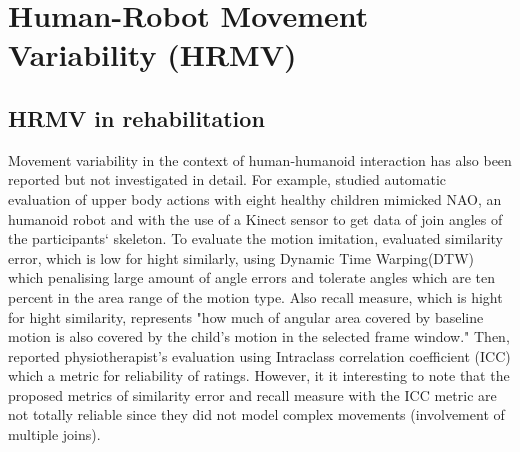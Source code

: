 \section{Human-Robot Movement Variability (HRMV)}


\subsection{HRMV in rehabilitation} 
Movement variability in the context of human-humanoid interaction has also been reported
but not investigated in detail.
For example, \cite{guneysu2014} studied automatic evaluation of upper body actions
with eight healthy children mimicked NAO, an humanoid robot and
with the use of a Kinect sensor to get data of join angles of the participants` skeleton.
To evaluate the motion imitation, \cite{guneysu2014} evaluated similarity error,
which is low for hight similarly, using Dynamic Time Warping(DTW) which penalising 
large amount of angle errors and tolerate angles which are ten percent in the area 
range of the motion type.
Also recall measure, which is hight for hight similarity, represents 
"how much of angular area covered by baseline motion is also covered
by the child's motion in the selected frame window."
Then, \cite{guneysu2014} reported physiotherapist's evaluation using Intraclass correlation 
coefficient (ICC) which a metric for reliability of ratings.
However, it it interesting to note that 
the proposed metrics of similarity error and recall measure with the ICC metric are not 
totally reliable since they did not model complex movements (involvement of multiple joins).
